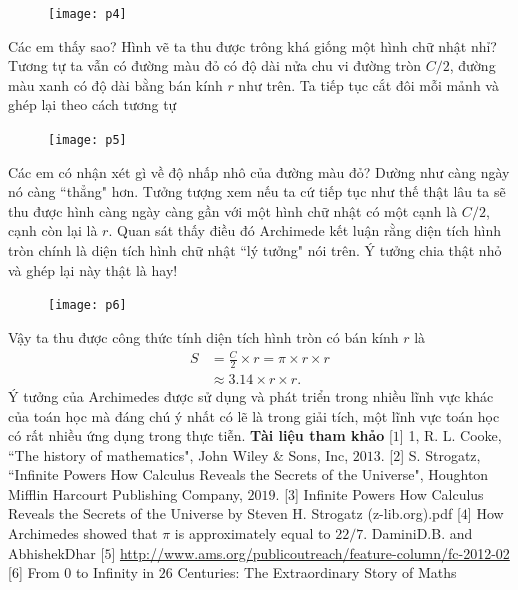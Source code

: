 \begin{multicols}{2}
\begin{figure}[H]
		\centering
		\captionsetup{labelformat= empty, justification=centering}
		\texttt{[image: p4]}
		\vspace*{-10pt}
	\end{figure}
	Các em thấy sao? Hình vẽ ta thu được trông khá giống một hình chữ nhật nhỉ? Tương tự ta vẫn có đường màu đỏ có độ dài nửa chu vi đường tròn $C/2$, đường màu xanh có độ dài bằng bán kính $r$ như trên.
	\vskip 0.1cm
	Ta tiếp tục cắt đôi mỗi mảnh và ghép lại theo cách tương tự
	\begin{figure}[H]
		\vspace*{-5pt}
		\centering
		\captionsetup{labelformat= empty, justification=centering}
		\texttt{[image: p5]}
		\vspace*{-10pt}
	\end{figure}
	Các em có nhận xét gì về độ nhấp nhô của đường màu đỏ? Dường như càng ngày nó càng ``thẳng" hơn. Tưởng tượng xem nếu ta cứ tiếp tục như thế thật lâu ta sẽ thu được hình càng ngày càng gần với một hình chữ nhật có một cạnh là $C/2$, cạnh còn lại là $r$. Quan sát thấy điều đó Archimede kết luận rằng diện tích hình tròn chính là diện tích hình chữ nhật ``lý tưởng" nói trên. Ý tưởng chia thật  nhỏ và ghép lại này thật là hay!
	\begin{figure}[H]
		\vspace*{-5pt}
		\centering
		\captionsetup{labelformat= empty, justification=centering}
		\texttt{[image: p6]}
		\vspace*{-10pt}
	\end{figure}
	Vậy ta thu được công thức tính diện tích hình tròn có bán kính $r$ là
	\begin{align*}
		S &= \frac{C}{2} \times r = \pi \times r \times r \\
		&\approx 3{.14} \times r \times r.
	\end{align*}
	Ý tưởng của Archimedes được sử dụng và phát triển trong nhiều lĩnh vực khác của toán học mà đáng chú ý nhất có lẽ là trong giải tích, một lĩnh vực toán học có rất nhiều ứng dụng trong thực tiễn.
	\vskip 0.1cm
	\textbf{\color{toancuabi}Tài liệu tham khảo}
	\vskip 0.1cm
	[$1$] 1, R. L. Cooke, ``The history of mathematics", John Wiley \& Sons, Inc, $2013$.
	\vskip 0.1cm
	[$2$] S. Strogatz, ``Infinite Powers How Calculus Reveals the Secrets of the Universe", Houghton Mifflin Harcourt Publishing Company, $2019$. 
	\vskip 0.1cm
	[$3$] Infinite Powers How Calculus Reveals the Secrets of the Universe by Steven H. Strogatz (z-lib.org).pdf
	\vskip 0.1cm
	[$4$] How Archimedes showed that $\pi$ is approximately equal to $22/7$. DaminiD.B. and AbhishekDhar 
	\vskip 0.1cm
	[$5$] \url{http://www.ams.org/publicoutreach/feature-column/fc-2012-02}
	\vskip 0.1cm
	[$6$] From $0$ to Infinity in $26$ Centuries: The Extraordinary Story of Maths
\end{multicols}
